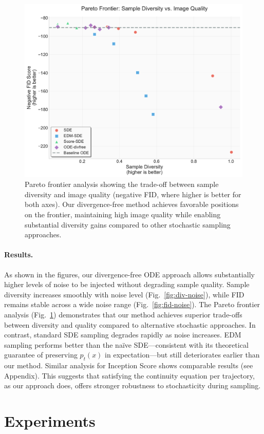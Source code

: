 \documentclass{article}
\begin{document}
\begin{figure}[H]
  \centering
  \includegraphics[width=0.7\linewidth]{figures/pareto_diversity_vs_fid.pdf}
  \caption{Pareto frontier analysis showing the trade-off between sample diversity and image quality (negative FID, where higher is better for both axes). Our divergence-free method achieves favorable positions on the frontier, maintaining high image quality while enabling substantial diversity gains compared to other stochastic sampling approaches.}
  \label{fig:pareto-fid}
\end{figure}

\paragraph{Results.}
As shown in the figures, our divergence-free ODE approach allows substantially higher levels of noise to be injected without degrading sample quality. Sample diversity increases smoothly with noise level (Fig.~\ref{fig:div-noise}), while FID remains stable across a wide noise range (Fig.~\ref{fig:fid-noise}). The Pareto frontier analysis (Fig.~\ref{fig:pareto-fid}) demonstrates that our method achieves superior trade-offs between diversity and quality compared to alternative stochastic approaches. In contrast, standard SDE sampling degrades rapidly as noise increases. EDM sampling performs better than the naïve SDE—consistent with its theoretical guarantee of preserving \(p_t(x)\) in expectation—but still deteriorates earlier than our method. Similar analysis for Inception Score shows comparable results (see Appendix). This suggests that satisfying the continuity equation per trajectory, as our approach does, offers stronger robustness to stochasticity during sampling.




\section{Experiments}
\end{document}
